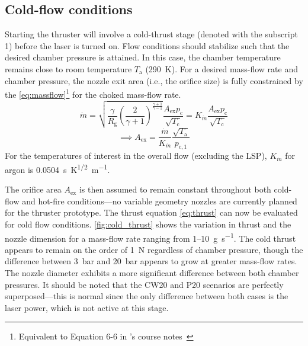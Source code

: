         \subsection{Cold-flow conditions}
            Starting the thruster will involve a cold-thrust stage (denoted with the subscript 1) before the laser is turned on. Flow conditions should stabilize such that the desired chamber pressure is attained. In this case, the chamber temperature remains close to room temperature $T_\mathrm{a}$ (\qty{290}{K}). For a desired mass-flow rate and chamber pressure, the nozzle exit area (i.e., the orifice size) is fully constrained by the \autoref{eq:massflow}\footnote{Equivalent to Equation 6-6 in \citeauthor{zandbergenAE4S01ThermalRocket2020}'s  course notes~\cite{zandbergenAE4S01ThermalRocket2020}} for the choked mass-flow rate.
            \begin{equation} 
                \dot{m} = \sqrt{\frac{\gamma}{R_\mathrm{g}}\left(\frac{2}{\gamma+1}\right)^\frac{\gamma+1}{\gamma-1}}\frac{A_\mathrm{ex}p_\mathrm{c}}{\sqrt{T_\mathrm{c}}} = K_{\dot{m}}\frac{A_\mathrm{ex}p_\mathrm{c}}{\sqrt{T_\mathrm{c}}} \label{eq:massflow}
            \end{equation}
            \begin{equation*}
                \implies A_\mathrm{ex} = \frac{\dot{m}}{K_{\dot{m}}}\frac{\sqrt{T_\mathrm{a}}}{p_\mathrm{c,1}}
            \end{equation*}
            For the temperatures of interest in the overall flow (excluding the LSP), $K_{\dot{m}}$ for argon is \qty{0.0504}{s.K^{1/2}.m^{-1}}. 

            The orifice area $A_\mathrm{ex}$ is then assumed to remain constant throughout both cold-flow and hot-fire conditions---no variable geometry nozzles are currently planned for the thruster prototype. The thrust equation \autoref{eq:thrust} can now be evaluated for cold flow conditions. \autoref{fig:cold_thrust} shows the variation in thrust and the nozzle dimension for a mass-flow rate ranging from 1--10~\unit{g.s^{-1}}. The cold thrust appears to remain on the order of \qty{1}{N} regardless of chamber pressure, though the difference between \qty{3}{bar} and \qty{20}{bar} appears to grow at greater mass-flow rates. The nozzle diameter exhibits a more significant difference between both chamber pressures. It should be noted that the CW20 and P20 scenarios are perfectly superposed---this is normal since the only difference between both cases is the laser power, which is not active at this stage.

